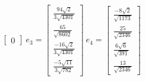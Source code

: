 \begin{gather*}
\begin{bmatrix}
        0
    \end{bmatrix}
    ~ e_3 = \begin{bmatrix}
        \frac{94\sqrt{2}}{3\sqrt{4301}}\\
        \frac{65}{\sqrt{8602}}\\
        \frac{-16\sqrt{2}}{3\sqrt{4301}}\\
        \frac{-5\sqrt{11}}{3\sqrt{782}}
    \end{bmatrix}
    ~ e_4 = \begin{bmatrix}
        \frac{-8\sqrt{2}}{\sqrt{1173}}\\
        \frac{25}{\sqrt{2346}}\\
        \frac{6\sqrt{6}}{\sqrt{391}}\\
        \frac{13}{\sqrt{2346}}
    \end{bmatrix}
\end{gather*}